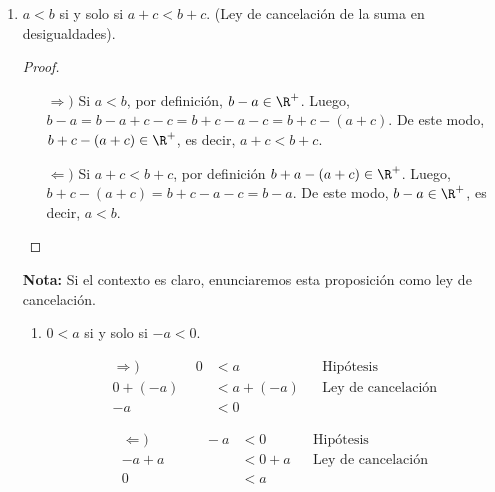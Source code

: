 \begin{enumerate}[label=\alph*)]
 \item $a<b$ si y solo si $a+c<b+c$. (Ley de cancelación de la suma en desigualdades).
 
 \begin{proof} \leavevmode
 \begin{itemize}
  \item[$\Rightarrow)$] Si $a<b$, por definición, $b-a \in \R^+$. Luego, $b-a=b-a+c-c=b+c-a-c=b+c-(a+c)$. De este modo, $b+c-(a+c)\in \R^+$, es decir, $a+c<b+c$.
  \item[$\Leftarrow)$] Si $a+c<b+c$, por definición $b+a-(a+c)\in \R^+$. Luego, $b+c-(a+c)=b+c-a-c=b-a$. De este modo, $b-a\in \R^+$, es decir, $a<b$. \qedhere
  \end{itemize} 
 \end{proof}
 \textbf{Nota:} Si el contexto es claro, enunciaremos esta proposición como ley de cancelación.

 \begin{enumerate}[label=\roman*)]
  \item $0<a$ si y solo si $-a<0$.
  \begin{center}\vspace{-1em}
   \begin{minipage}[l]{.5\linewidth}
    \begin{align*}
     \Rightarrow) \qquad \qquad
     0 &< a && \text{Hipótesis}\\
     0 + (-a) &< a + (-a) && \text{Ley de cancelación}\\
     -a &< 0%
    \end{align*}
  \end{minipage}%
  \begin{minipage}[r]{.5\linewidth}
   \begin{align*}
    \Leftarrow) \qquad \qquad
    -a &< 0 && \text{Hipótesis}\\
    -a + a &< 0 + a && \text{Ley de cancelación}\\
    0 &< a%
   \end{align*}
  \end{minipage}
  \end{center}


\end{enumerate}
\end{enumerate}
